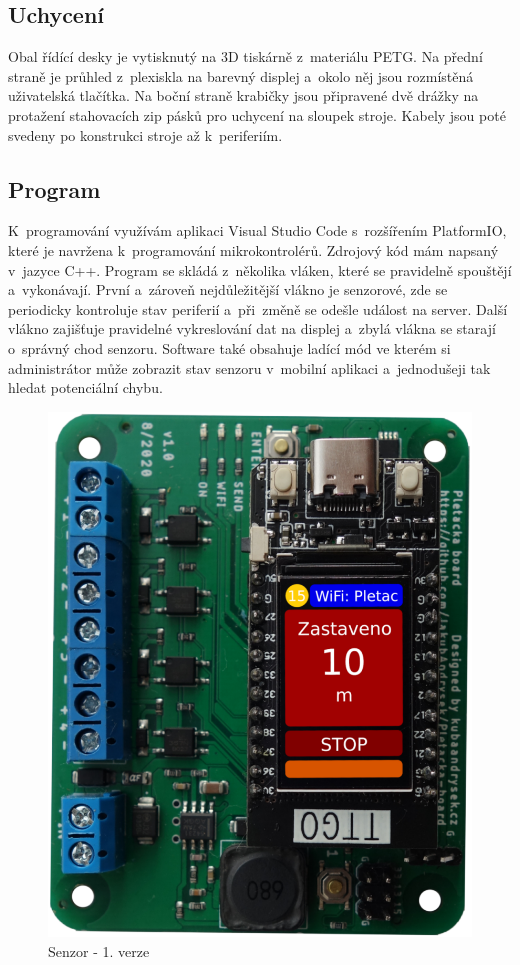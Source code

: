 \subsection{Uchycení}
Obal řídící desky je vytisknutý na 3D tiskárně z~materiálu PETG.
Na přední straně je průhled z~plexiskla na barevný displej a~okolo něj jsou rozmístěná uživatelská tlačítka.
Na boční straně krabičky jsou připravené dvě drážky na protažení stahovacích zip pásků pro uchycení na sloupek stroje.
Kabely jsou poté svedeny po konstrukci stroje až k~periferiím.


\subsection{Program}
K~programování využívám aplikaci Visual Studio Code s~rozšířením PlatformIO, které je navržena k~programování mikrokontrolérů. 
Zdrojový kód mám napsaný v~jazyce C++.
Program se skládá z~několika vláken, které se pravidelně spouštějí a~vykonávají.
První a~zároveň nejdůležitější vlákno je senzorové, zde se periodicky kontroluje stav periferií a~při~změně se odešle událost na server.
Další vlákno zajišťuje pravidelné vykreslování dat na displej a~zbylá vlákna se starají o~správný chod senzoru.
Software také obsahuje ladící mód ve kterém si administrátor může zobrazit stav senzoru v~mobilní aplikaci a~jednodušeji tak hledat potenciální chybu. 


\begin{figure}[htbp]
    \centering
    \includegraphics[width=\textwidth/2]{img/V1-deska-esp-screen.png}
    \caption{Senzor - 1. verze}
    \label{fig:SenzorV1}
\end{figure}


